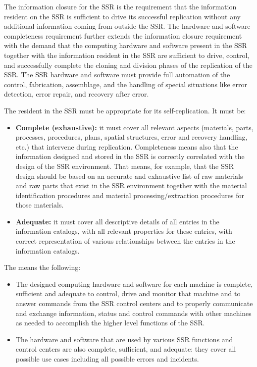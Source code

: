 The information closure for the
SSR is the requirement that the information resident on the SSR is
sufficient to drive its successful replication without any additional
information coming from outside the SSR. The hardware and software
completeness requirement further extends the information closure
requirement with the demand that the computing hardware and software
present in the SSR together with the information resident in the SSR
are sufficient to drive, control, and successfully complete the cloning
and division phases of the replication of the SSR. The SSR hardware and
software must provide full automation of the control, fabrication,
assemblage, and the handling of special situations like error detection,
error repair, and recovery after error.

The  resident in the SSR must be
appropriate for its self-replication. It must be:

\begin{itemize}
\item \textbf{Complete (exhaustive):} it must cover all relevant aspects
(materials, parts, processes, procedures, plans, spatial structures,
error and recovery handling, etc.) that intervene during replication.
Completeness means also that the information designed and stored in the
SSR is correctly correlated with the design of the SSR environment.
That means, for example, that the SSR design should be based on an
accurate and exhaustive list of raw materials and raw parts that exist
in the SSR environment together with the material identification
procedures and material processing/extraction procedures for those
materials.
\item \textbf{Adequate:} it must cover all descriptive details of all
entries in the information catalogs, with all relevant properties for
these entries, with correct representation of various relationships
between the entries in the information catalogs.
\end{itemize}

The 
means the following:

\begin{itemize}
\item The designed computing hardware and software for each machine is
complete, sufficient and adequate to control, drive and monitor that
machine and to answer commands from the SSR control centers and to
properly communicate and exchange information, status and control
commands with other machines as needed to accomplish the higher level
functions of the SSR.
\item The hardware and software that are used by various SSR functions
and control centers are also complete, sufficient, and adequate: they
cover all possible use cases including all possible errors and
incidents.
\end{itemize}

